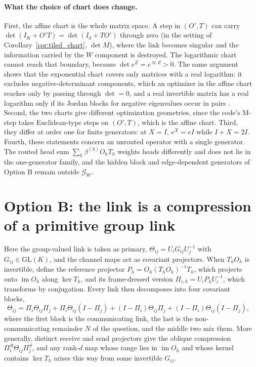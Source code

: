 \documentclass[11pt]{article}
\theoremstyle{definition}
\theoremstyle{remark}
\newcommand{\GL}{\mathrm{GL}}
\newcommand{\tr}{\operatorname{tr}}
\newcommand{\im}{\operatorname{im}}
\begin{document}
\paragraph{What the choice of chart does change.}
First, the affine chart is the whole matrix space. A step in $(O',T)$ can carry $\det(I_K+O'T)=\det(I_d+TO')$ through zero (in the setting of Corollary~\ref{cor:tiled_chart}, $\det M$), where the link becomes singular and the information carried by the $W$ component is destroyed. The logarithmic chart cannot reach that boundary, because $\det e^Z=e^{\tr Z}>0$. The same argument shows that the exponential chart covers only matrices with a real logarithm: it excludes negative-determinant components, which an optimizer in the affine chart reaches only by passing through $\det=0$, and a real invertible matrix has a real logarithm only if its Jordan blocks for negative eigenvalues occur in pairs \cite{culver1966}. Second, the two charts give different optimization geometries, since the code's M-step takes Euclidean-type steps on $(O',T)$, which is the affine chart. Third, they differ at order one for finite generators: at $X=I$, $e^X=eI$ while $I+X=2I$. Fourth, these statements concern an unrouted operator with a single generator. The routed head sum $\sum_h\beta^{(h)}O_hT_h$ weights heads differently and does not lie in the one-generator family, and the hidden block and edge-dependent generators of Option B remain outside $\mathcal G_W$.

\section{Option B: the link is a compression of a primitive group link}
\label{sec:compression}

Here the group-valued link is taken as primary, $\Theta_{ij}=U_iG_{ij}U_j^{-1}$ with $G_{ij}\in\GL(K)$, and the channel maps act as covariant projectors. When $T_hO_h$ is invertible, define the reference projector $P_h=O_h(T_hO_h)^{-1}T_h$, which projects onto $\im O_h$ along $\ker T_h$, and its frame-dressed version $\Pi_{i,h}=U_iP_hU_i^{-1}$, which transforms by conjugation. Every link then decomposes into four covariant blocks,
\begin{equation}
\Theta_{ij}=\Pi_{i}\Theta_{ij}\Pi_{j}+\Pi_{i}\Theta_{ij}(I-\Pi_{j})+(I-\Pi_{i})\Theta_{ij}\Pi_{j}+(I-\Pi_{i})\Theta_{ij}(I-\Pi_{j}),
\label{eq:blocks}
\end{equation}
where the first block is the communicating link, the last is the non-communicating remainder $N$ of the question, and the middle two mix them. More generally, distinct receive and send projectors give the oblique compression $\Pi^R_i\Theta_{ij}\Pi^S_j$, and any rank-$d$ map whose range lies in $\im O_h$ and whose kernel contains $\ker T_h$ arises this way from some invertible $G_{ij}$.
\end{document}
